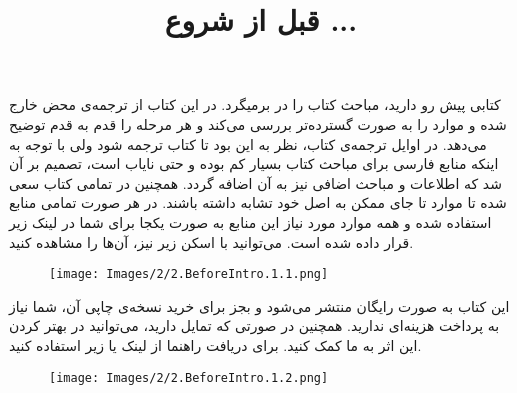 \textbf{\vspace{80pt}}
\title{
    \BTitr
    \Huge
    \hspace{-40pt}
    \begin{flushright}
        قبل از شروع ...
    \end{flushright}
}
\textbf{\vspace{80pt}}

{
    \Large
    کتابی پیش رو دارید، مباحث کتاب  را در برمیگرد.
    در این کتاب از ترجمه‌ی محض خارج شده و موارد را به صورت گسترده‌تر بررسی می‌کند و هر مرحله را قدم به قدم توضیح می‌دهد.
    در اوایل ترجمه‌ی کتاب، نظر به این بود تا کتاب ترجمه شود ولی با توجه به اینکه منابع فارسی برای مباحث کتاب بسیار کم بوده و حتی نایاب است، تصمیم بر آن شد که اطلاعات و مباحث اضافی نیز به آن اضافه گردد.
    همچنین در تمامی کتاب سعی شده تا موارد تا جای ممکن به اصل خود تشابه داشته باشند.
    در هر صورت تمامی منابع استفاده شده و همه موارد مورد نیاز این منابع به صورت یکجا برای شما در لینک زیر قرار داده شده است.
    می‌توانید با اسکن  زیر نیز، آن‌ها را مشاهده کنید.

    \begin{figure}[H]
        \centering
        \setlength{\belowcaptionskip}{-10pt}
        \texttt{[image: Images/2/2.BeforeIntro.1.1.png]}
        \caption*{\Large {}}
    \end{figure}

    این کتاب به صورت رایگان منتشر می‌شود و بجز برای خرید نسخه‌ی چاپی آن، شما نیاز به پرداخت هزینه‌ای ندارید.
    همچنین در صورتی که تمایل دارید، می‌توانید در بهتر کردن این اثر به ما کمک کنید. برای دریافت راهنما از لینک یا  زیر استفاده کنید.

    \begin{figure}[H]
        \centering
        \Large
        \setlength{\belowcaptionskip}{-10pt}
        \texttt{[image: Images/2/2.BeforeIntro.1.2.png]}
        \caption*{\Large {}}
    \end{figure}
}

\newpage